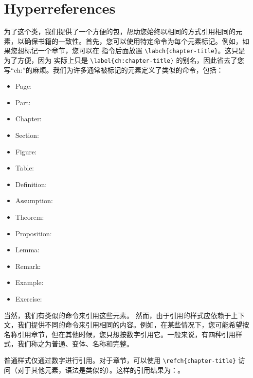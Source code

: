 


\section{Hyperreferences}


为了这个类，我们提供了一个方便的包，帮助您始终以相同的方式引用相同的元素，以确保书籍的一致性。首先，您可以使用特定命令为每个元素标记。例如，如果您想标记一个章节，您可以在  指令后面放置 \lstinline|\labch{chapter-title}|。这只是为了方便，因为  实际上只是 \lstinline|\label{ch:chapter-title}| 的别名，因此省去了您写\enquote{ch:}的麻烦。我们为许多通常被标记的元素定义了类似的命令，包括：

\begin{multicols}{2}
\setlength{\columnseprule}{0pt}
\begin{itemize}
	\item Page: 
	\item Part: 
	\item Chapter: 
	\item Section: 
	\item Figure: 
	\item Table: 
	\item Definition: 
	\item Assumption: 
	\item Theorem: 
	\item Proposition: 
	\item Lemma: 
	\item Remark: 
	\item Example: 
	\item Exercise: 
\end{itemize}
\end{multicols}

当然，我们有类似的命令来引用这些元素。
然而，由于引用的样式应依赖于上下文，我们提供不同的命令来引用相同的内容。例如，在某些情况下，您可能希望按名称引用章节，但在其他时候，您只想按数字引用它。一般来说，有四种引用样式，我们称之为普通、变体、名称和完整。

普通样式仅通过数字进行引用。对于章节，可以使用 \lstinline|\refch{chapter-title}| 访问（对于其他元素，语法是类似的）。这样的引用结果为：。


